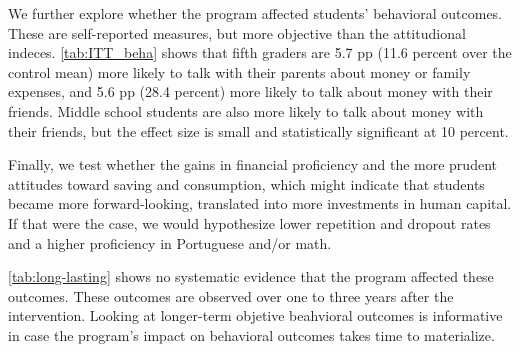 \newpage

We further explore whether the program affected students' behavioral outcomes. These are self-reported measures, but more objective than the attitudional indeces. \autoref{tab:ITT_beha} shows that fifth graders are 5.7 pp (11.6 percent over the control mean) more likely to talk with their parents about money or family expenses, and 5.6 pp (28.4 percent) more likely to talk about money with their friends. Middle school students are also more likely to talk about money with their friends, but the effect size is small and statistically significant at 10 percent. 

Finally, we test whether the gains in financial proficiency and the more prudent attitudes toward saving and consumption, which might indicate that students became more forward-looking, translated into more investments in human capital. If that were the case, we would hypothesize lower repetition and dropout rates and a higher proficiency in Portuguese and/or math.


\autoref{tab:long-lasting} shows no systematic evidence that the program affected these outcomes. These outcomes are observed over one to three years after the intervention. Looking at longer-term objetive beahvioral outcomes is informative in case the program's impact on behavioral outcomes takes time to materialize. 
 
